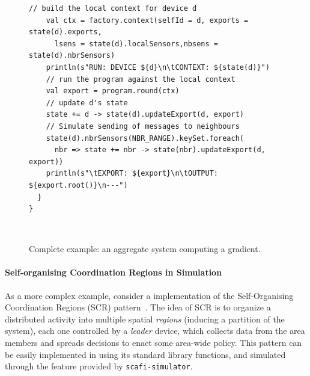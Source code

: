 \begin{figure}
\begin{lrbox}{\exosystem}
\begin{lstlisting}[deletekeywords={[2]{nbr}},
emph={state}, basicstyle=\lst@ifdisplaystyle\footnotesize\fi\ttfamily]
    // build the local context for device d
    val ctx = factory.context(selfId = d, exports = state(d).exports,
      lsens = state(d).localSensors,nbsens = state(d).nbrSensors)
    println(s"RUN: DEVICE ${d}\n\tCONTEXT: ${state(d)}")
    // run the program against the local context
    val export = program.round(ctx)
    // update d's state
    state += d -> state(d).updateExport(d, export)
    // Simulate sending of messages to neighbours
    state(d).nbrSensors(NBR_RANGE).keySet.foreach(
      nbr => state += nbr -> state(nbr).updateExport(d, export))
    println(s"\tEXPORT: ${export}\n\tOUTPUT: ${export.root()}\n---")
  }
}
\end{lstlisting}
\end{lrbox}
\\
\caption{Complete example: an aggregate system computing a gradient.}
\label{fig:example-full}
\end{figure}

\paragraph{Self-organising Coordination Regions in Simulation}
%
As a more complex example,
 consider a \scafi{} implementation of the
 Self-Organising Coordination Regions (SCR) pattern~\cite{DBLP:journals/fgcs/PianiniCVN21}.
%
The idea of SCR is to organize a distributed activity
 into multiple spatial \emph{regions} (inducing a partition of the system),
 each one controlled by a \emph{leader} device,
 which collects data from the area members
 and spreads decisions to enact some area-wide policy.
%
This pattern can be easily implemented in \scafi{} 
 using its standard library functions,
 and simulated through the feature provided by \texttt{scafi-simulator}. 
%
%

